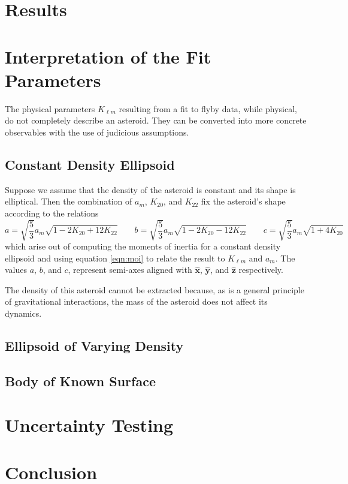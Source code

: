 \documentclass[11pt]{article}
\newcommand{\unit}[1]{\hat{\mathbf{#1}}}
\begin{document}
\section{Results}


\section{Interpretation of the Fit Parameters}
The physical parameters $K_{\ell m}$ resulting from a fit to flyby data, while physical, do not completely describe an asteroid. They can be converted into more concrete observables with the use of judicious assumptions.

\subsection{Constant Density Ellipsoid}
Suppose we assume that the density of the asteroid is constant and its shape is elliptical. Then the combination of $a_m$, $K_{20}$, and $K_{22}$ fix the asteroid's shape according to the relations
\begin{equation}
a = \sqrt{\frac{5}{3}}a_m\sqrt{1-2K_{20}+12K_{22}} \qquad b = \sqrt{\frac{5}{3}}a_m\sqrt{1-2K_{20}-12K_{22}} \qquad c = \sqrt{\frac{5}{3}}a_m\sqrt{1+4K_{20}}
\label{eqn:ellipsoid-klm}
\end{equation}
which arise out of computing the moments of inertia for a constant density ellipsoid and using equation \ref{eqn:moi} to relate the result to $K_{\ell m}$ and $a_m$. The values $a$, $b$, and $c$, represent semi-axes aligned with $\unit x$, $\unit y$, and $\unit z$ respectively.

The density of this asteroid cannot be extracted because, as is a general principle of gravitational interactions, the mass of the asteroid does not affect its dynamics.



\subsection{Ellipsoid of Varying Density}


\subsection{Body of Known Surface}


\section{Uncertainty Testing}


\section{Conclusion}



\end{document}
